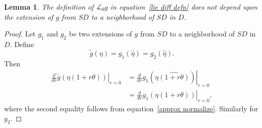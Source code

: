 \documentclass[reqno,12pt]{amsart}
\newcommand\setdualquat{D}
\newcommand\setunitdualquat{SD}
\newcommand{\liederiv}{\mathcal L}
\newtheorem{lemma}{Lemma}
\begin{document}
\begin{lemma}
\label{not depend}
The definition of $\liederiv_\theta g$ in equation~\eqref{lie diff defn} does not depend upon the extension of $g$ from $\setunitdualquat$ to a neighborhood of $\setunitdualquat$ in $\setdualquat$.
\end{lemma}

\begin{proof}  Let $g_1$ and $g_2$ be two extensions of $g$ from $\setunitdualquat$ to a neighborhood of $\setunitdualquat$ in $\setdualquat$.  Define
\begin{equation}
\tilde g(\eta) = g_1(\widehat\eta) = g_2(\widehat\eta).
\end{equation}
Then
\begin{equation}
\begin{aligned}
\left.\frac{d}{d r} \tilde g(\eta(1+r\theta)) \right |_{r = 0}
&=
\left.\frac{d}{d r} g_1(\eta\widehat{(1+r\theta)}) \right |_{r = 0} \\
&=\left.\frac{d}{d r} g_1(\eta(1+r\theta)) \right |_{r = 0},
\end{aligned}
\end{equation}
where the second equality follows from equation~\eqref{approx normalize}.  Similarly for $g_2$.
\end{proof}
\end{document}
